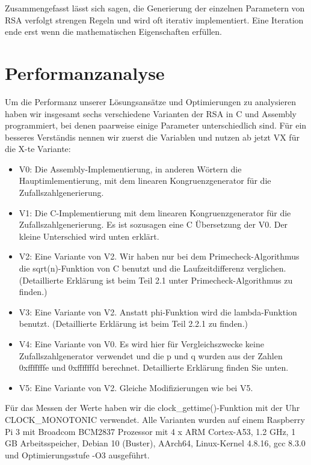 \documentclass[course=asp]{aspdoc}
\begin{document}
Zusammengefasst lässt sich sagen, die Generierung der einzelnen Parametern von RSA verfolgt strengen Regeln und wird oft iterativ implementiert. Eine Iteration ende erst wenn die mathematischen Eigenschaften erfüllen. 

\section{Performanzanalyse}
Um die Performanz unserer Lösungsansätze und Optimierungen zu analysieren haben wir insgesamt sechs verschiedene Varianten der RSA in C und Assembly programmiert, bei denen paarweise einige Parameter unterschiedlich sind. Für ein besseres Verständis nennen wir zuerst die Variablen und nutzen ab jetzt VX für die X-te Variante:

\begin{itemize}
	\item V0: Die Assembly-Implementierung, in anderen Wörtern die Hauptimlementierung, mit dem linearen Kongruenzgenerator für die Zufallszahlgenerierung.
	\item V1: Die C-Implementierung mit dem linearen Kongruenzgenerator für die Zufallszahlgenerierung. Es ist sozusagen eine C Übersetzung der V0. Der kleine Unterschied wird unten erklärt.
	\item V2: Eine Variante von V2. Wir haben nur bei dem Primecheck-Algorithmus die sqrt(n)-Funktion von C benutzt und die Laufzeitdifferenz verglichen. (Detaillierte Erklärung ist beim Teil 2.1 unter Primecheck-Algorithmus zu finden.)
	\item V3: Eine Variante von V2. Anstatt phi-Funktion wird die lambda-Funktion benutzt. (Detaillierte Erklärung ist beim Teil 2.2.1 zu finden.)
	\item V4: Eine Variante von V0. Es wird hier für Vergleichszwecke keine Zufallszahlgenerator verwendet und die p und q wurden aus der Zahlen 0xfffffffe und 0xfffffffd berechnet. Detaillierte Erklärung finden Sie unten.
	\item V5: Eine Variante von V2. Gleiche Modifizierungen wie bei V5.
\end{itemize}


Für das Messen der Werte haben wir die clock\_gettime()-Funktion mit der Uhr CLOCK\_MONOTONIC verwendet. Alle Varianten wurden auf einem Raspberry Pi 3 mit Broadcom BCM2837 Prozessor mit 4 x ARM Cortex-A53, 1.2 GHz, 1 GB Arbeitsspeicher, Debian 10 (Buster), AArch64, Linux-Kernel 4.8.16, gcc 8.3.0 und Optimierungsstufe -O3 ausgeführt.
\end{document}
